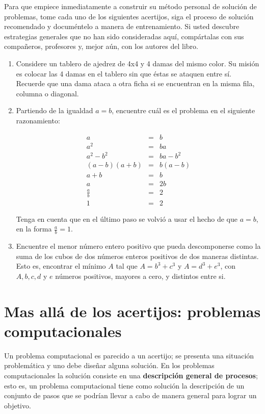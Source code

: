 Para que empiece inmediatamente a construir su método personal de solución de
problemas, tome cada uno de los siguientes acertijos, siga el proceso de 
solución recomendado y documéntelo a manera de entrenamiento. Si usted descubre 
estrategias generales que no han sido consideradas aquí, compártalas con sus
compañeros, profesores y, mejor aún, con los autores del libro.

\begin{enumerate}
	\item Considere un tablero de ajedrez de 4x4 y 4 damas del mismo color. Su 
	misión es colocar las 4 damas en el tablero sin que éstas se ataquen entre 
	sí. Recuerde que una dama ataca a otra ficha si se encuentran en la misma 
	fila, columna o diagonal.
	
	\item Partiendo de la igualdad $a=b$, encuentre cuál es el problema en el 
	siguiente razonamiento:
	
	\begin{eqnarray*}
	a & = & b\\
	a^{2} & = & ba\\
	a^{2}-b^{2} & = & ba-b^{2}\\
	(a-b)(a+b) & = & b(a-b)\\
	a+b & = & b\\
	a & = & 2b\\
	\frac{a}{b} & = & 2\\
	1 & = & 2
	\end{eqnarray*}
	
	Tenga en cuenta que en el último paso se volvió a usar el hecho de que 
	$a=b$, en la forma $\frac{a}{b}=1$.
	
	\item Encuentre el menor número entero positivo que pueda descomponerse 
	como la suma de los cubos de dos números enteros positivos de dos maneras 
	distintas. Esto es,	encontrar el mínimo $A$ tal que $A=b^3+c^3$ y 
	$A=d^3+e^3$, con $A,b,c,d$ y $e$ números positivos, mayores a cero, y 
	distintos entre si.
\end{enumerate}


\section{Mas allá de los acertijos: problemas computacionales}

Un problema computacional es parecido a un acertijo; se presenta una situación
problemática y uno debe diseñar alguna solución. En los problemas 
computacionales la solución consiste en una {\bf descripción general de 
procesos}; esto es, un problema computacional tiene como solución la 
descripción de un conjunto de pasos que se podrían llevar a cabo de manera 
general para lograr un objetivo.

